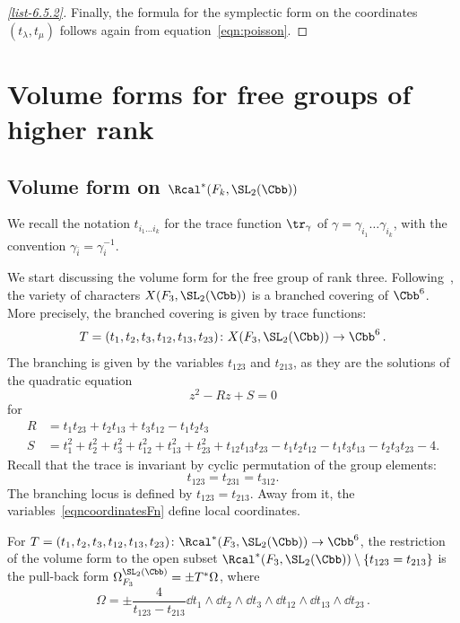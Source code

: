 \begin{proofc}
\begin{proof}[\eqref{list-6.5.2}]
Finally, the formula for the symplectic form on the coordinates $(t_\lambda,t_\mu)$ follows again from equation~\eqref{eqn:poisson}.
\end{proof}
\let\qed\relax
\end{proofc}



\section{Volume forms for free groups of higher rank}\label{section:higherrank}


\subsection{Volume form on \texorpdfstring{$\Rcal^*(F_k,\SL_2(\Cbb)) $}{R*(Fk, SL2) }}


We recall the notation $t_{i_1\dots i_k}$ for the trace function $\tr_\gamma$ of $\gamma=\gamma_{i_1}\dots \gamma_{i_k}$, with the convention $\gamma_{\bar i}=\gamma_i ^{-1}$.

We start discussing the volume form for the free group of rank three. Following~\cite{AcunaMontesinos}, the variety of characters $X(F_3,\SL_2(\Cbb))$ is a branched covering of $\Cbb^{6}$. More precisely, the branched covering is given by trace functions:
\begin{equation}\label{eqncoordinatesFn}
T = (t_1, t_2, t_{3}, t_{12}, t_{13}, t_{23})\colon X(F_3,\SL_2(\Cbb))\to \Cbb^{6}\,.
\end{equation}
The branching is given by the variables $t_{123}$ and $t_{213}$, as they are the solutions of the quadratic equation
\[
z^2-R z+S=0
\]
for
\begin{align}\label{eqn:P}
R &= t_1 t_{23} + t_2 t_{13} + t_3 t_{12}- t_1 t_2 t_3 \\\label{eqn:Q}
S &= t_1^2+t_2^2+t_3^2+t_{12}^2+t_{13}^2+t_{23}^2+t_{12}t_{13}t_{23}- t_1t_2t_{12}- t_1t_3t_{13}- t_2t_3t_{23}-4.
\end{align}
Recall that the trace is invariant by cyclic permutation of the group elements:
\[
t_{123}=t_{231}=t_{312}.
\]
The branching locus is defined by $t_{123}= t_{213}$. Away from it, the variables~\eqref{eqncoordinatesFn} define local coordinates.


\begin{prop}\label{Prop:volFn}
For $T = (t_1, t_2, t_{3}, t_{12}, t_{13}, t_{23})\colon \Rcal^*(F_3,\SL_2(\Cbb))\to \Cbb^{6}$,
the restriction of the volume form to the open subset $\Rcal^*(F_3,\SL_2(\Cbb))\setminus\{ t_{123}= t_{213}\}$ is the pull-back form $ \Omega^{\SL_2(\Cbb)}_{F_3}=\pm T^*\Omega$, where
\begin{equation}\label{eqn:OmegaF3}
\Omega = \pm \frac{4}{t_{123}-t_{213} } \dd t_1 \wedge \dd t_2 \wedge \dd t_3 \wedge \dd t_{12}
\wedge \dd t_{13} \wedge \dd t_{23} \,.
\end{equation}
\end{prop}


